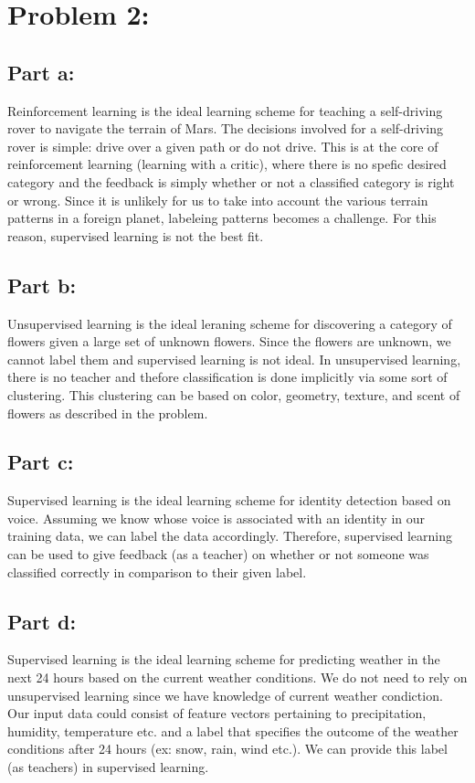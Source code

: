 \documentclass[a4paper,12pt]{article}
\begin{document}
\section*{Problem 2:}
\subsection*{Part a:}
Reinforcement learning is the ideal learning scheme for teaching a self-driving rover to navigate the terrain of Mars. The decisions involved for a self-driving rover is simple: drive over a given path or do not drive. This is at the core of reinforcement learning (learning with a critic), where there is no spefic desired category and the feedback is simply whether or not a classified category is right or wrong. Since it is unlikely for us to take into account the various terrain patterns in a foreign planet, labeleing patterns becomes a challenge. For this reason, supervised learning is not the best fit.

\subsection*{Part b:}
Unsupervised learning is the ideal leraning scheme for discovering a category of flowers given a large set of unknown flowers. Since the flowers are unknown, we cannot label them and supervised learning is not ideal. In unsupervised learning, there is no teacher and thefore classification is done implicitly via some sort of clustering. This clustering can be based on color, geometry, texture, and scent of flowers as described in the problem.

\subsection*{Part c:}
Supervised learning is the ideal learning scheme for identity detection based on voice. Assuming we know whose voice is associated with an identity in our training data, we can label the data accordingly. Therefore, supervised learning can be used to give feedback (as a teacher) on whether or not someone was classified correctly in comparison to their given label. 

\subsection*{Part d:}
Supervised learning is the ideal learning scheme for predicting weather in the next 24 hours based on the current weather conditions.  We do not need to rely on unsupervised learning since we have knowledge of current weather condiction. Our input data could consist of feature vectors pertaining to precipitation, humidity, temperature etc. and a label that specifies the outcome of the weather conditions after 24 hours (ex: snow, rain, wind etc.). We can provide this label (as teachers) in supervised learning.
\end{document}
